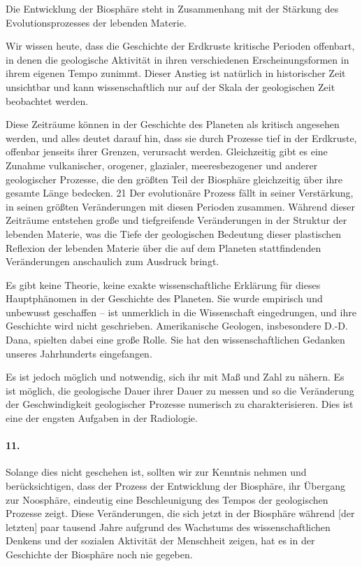 \documentclass[11pt,a4paper]{book}
\begin{document}
Die Entwicklung der Biosphäre steht in Zusammenhang mit der Stärkung des
Evolutionsprozesses der lebenden Materie.

Wir wissen heute, dass die Geschichte der Erdkruste kritische Perioden
offenbart, in denen die geologische Aktivität in ihren verschiedenen
Erscheinungsformen in ihrem eigenen Tempo zunimmt. Dieser Anstieg ist
natürlich in historischer Zeit unsichtbar und kann wissenschaftlich nur auf
der Skala der geologischen Zeit beobachtet werden.

Diese Zeiträume können in der Geschichte des Planeten als kritisch angesehen
werden, und alles deutet darauf hin, dass sie durch Prozesse tief in der
Erdkruste, offenbar jenseits ihrer Grenzen, verursacht werden. Gleichzeitig
gibt es eine Zunahme vulkanischer, orogener, glazialer, meeresbezogener und
anderer geologischer Prozesse, die den größten Teil der Biosphäre gleichzeitig
über ihre gesamte Länge bedecken. 21 Der evolutionäre Prozess fällt in seiner
Verstärkung, in seinen größten Veränderungen mit diesen Perioden
zusammen. Während dieser Zeiträume entstehen große und tiefgreifende
Veränderungen in der Struktur der lebenden Materie, was die Tiefe der
geologischen Bedeutung dieser plastischen Reflexion der lebenden Materie über
die auf dem Planeten stattfindenden Veränderungen anschaulich zum Ausdruck
bringt.

Es gibt keine Theorie, keine exakte wissenschaftliche Erklärung für dieses
Hauptphänomen in der Geschichte des Planeten. Sie wurde empirisch und
unbewusst geschaffen -- ist unmerklich in die Wissenschaft eingedrungen, und
ihre Geschichte wird nicht geschrieben. Amerikanische Geologen, insbesondere
D.-D. Dana, spielten dabei eine große Rolle. Sie hat den wissenschaftlichen
Gedanken unseres Jahrhunderts eingefangen.

Es ist jedoch möglich und notwendig, sich ihr mit Maß und Zahl zu nähern. Es
ist möglich, die geologische Dauer ihrer Dauer zu messen und so die
Veränderung der Geschwindigkeit geologischer Prozesse numerisch zu
charakterisieren. Dies ist eine der engsten Aufgaben in der Radiologie.

\paragraph{11.}
Solange dies nicht geschehen ist, sollten wir zur Kenntnis nehmen und
berücksichtigen, dass der Prozess der Entwicklung der Biosphäre, ihr Übergang
zur Noosphäre, eindeutig eine Beschleunigung des Tempos der geologischen
Prozesse zeigt. Diese Veränderungen, die sich jetzt in der Biosphäre während
[der letzten] paar tausend Jahre aufgrund des Wachstums des wissenschaftlichen
Denkens und der sozialen Aktivität der Menschheit zeigen, hat es in der
Geschichte der Biosphäre noch nie gegeben.
\end{document}
